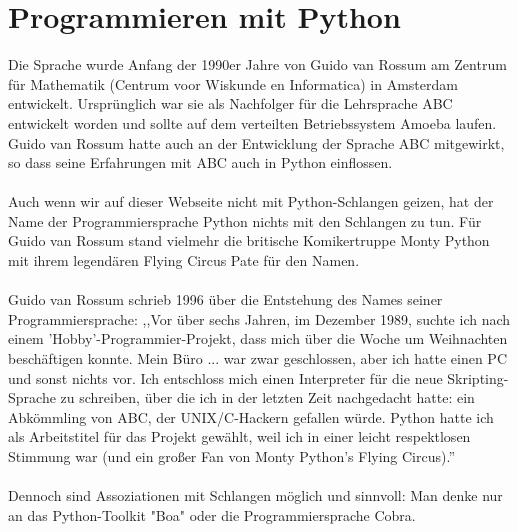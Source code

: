 \section{Programmieren mit Python}
Die Sprache wurde Anfang der 1990er Jahre von Guido van Rossum am Zentrum für Mathematik (Centrum voor Wiskunde en Informatica) in Amsterdam entwickelt. Ursprünglich war sie als Nachfolger für die Lehrsprache ABC entwickelt worden und sollte auf dem verteilten Betriebssystem Amoeba laufen. Guido van Rossum hatte auch an der Entwicklung der Sprache ABC mitgewirkt, so dass seine Erfahrungen mit ABC auch in Python einflossen.\\
\\
Auch wenn wir auf dieser Webseite nicht mit Python-Schlangen geizen, hat der Name der Programmiersprache Python nichts mit den Schlangen zu tun. Für Guido van Rossum stand vielmehr die britische Komikertruppe Monty Python mit ihrem legendären Flying Circus Pate für den Namen.\\
\\
Guido van Rossum schrieb 1996 über die Entstehung des Names seiner Programmiersprache: ,,Vor über sechs Jahren, im Dezember 1989, suchte ich nach einem 'Hobby'-Programmier-Projekt, dass mich über die Woche um Weihnachten beschäftigen konnte. Mein Büro ... war zwar geschlossen, aber ich hatte einen PC und sonst nichts vor. Ich entschloss mich einen Interpreter für die neue Skripting-Sprache zu schreiben, über die ich in der letzten Zeit nachgedacht hatte: ein Abkömmling von ABC, der UNIX/C-Hackern gefallen würde. Python hatte ich als Arbeitstitel für das Projekt gewählt, weil ich in einer leicht respektlosen Stimmung war (und ein großer Fan von Monty Python's Flying Circus).'' \\
\\
Dennoch sind Assoziationen mit Schlangen möglich und sinnvoll: Man denke nur an das Python-Toolkit "Boa" oder die Programmiersprache Cobra.

